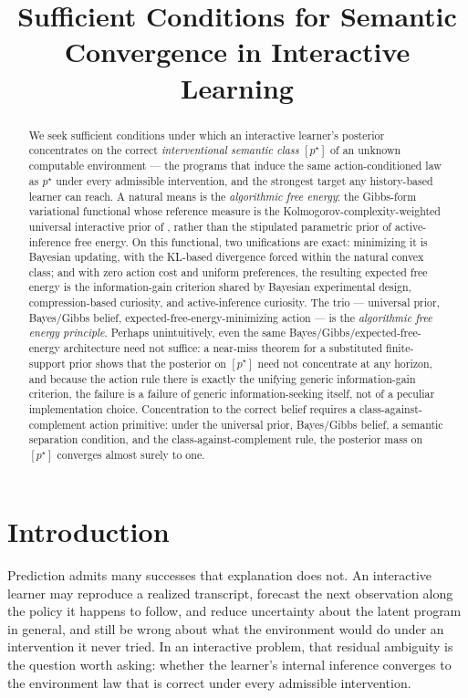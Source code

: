 \documentclass[11pt]{article}
\title{Sufficient Conditions for Semantic Convergence in Interactive Learning}
\author{}
\date{}
\theoremstyle{definition}
\theoremstyle{remark}
\begin{document}
\maketitle

\begin{abstract}
We seek sufficient conditions under which an interactive learner's posterior concentrates on the correct \emph{interventional semantic class} $[p^\star]$ of an unknown computable environment --- the programs that induce the same action-conditioned law as $p^\star$ under every admissible intervention, and the strongest target any history-based learner can reach. A natural means is the \emph{algorithmic free energy}: the Gibbs-form variational functional whose reference measure is the Kolmogorov-complexity-weighted universal interactive prior of \citet{Solomonoff1964a,Solomonoff1964b,Kolmogorov1965,Hutter2005}, rather than the stipulated parametric prior of active-inference free energy. On this functional, two unifications are exact: minimizing it is Bayesian updating, with the KL-based divergence forced within the natural convex class; and with zero action cost and uniform preferences, the resulting expected free energy is the information-gain criterion shared by Bayesian experimental design, compression-based curiosity, and active-inference curiosity. The trio --- universal prior, Bayes/Gibbs belief, expected-free-energy-minimizing action --- is the \emph{algorithmic free energy principle}. Perhaps unintuitively, even the same Bayes/Gibbs/expected-free-energy architecture need not suffice: a near-miss theorem for a substituted finite-support prior shows that the posterior on $[p^\star]$ need not concentrate at any horizon, and because the action rule there is exactly the unifying generic information-gain criterion, the failure is a failure of generic information-seeking itself, not of a peculiar implementation choice. Concentration to the correct belief requires a class-against-complement action primitive: under the universal prior, Bayes/Gibbs belief, a semantic separation condition, and the class-against-complement rule, the posterior mass on $[p^\star]$ converges almost surely to one.
\end{abstract}

\section{Introduction}
\label{sec:intro}

Prediction admits many successes that explanation does not. An interactive learner may reproduce a realized transcript, forecast the next observation along the policy it happens to follow, and reduce uncertainty about the latent program in general, and still be wrong about what the environment would do under an intervention it never tried. In an interactive problem, that residual ambiguity is the question worth asking: whether the learner's internal inference converges to the environment law that is correct under every admissible intervention.
\end{document}
